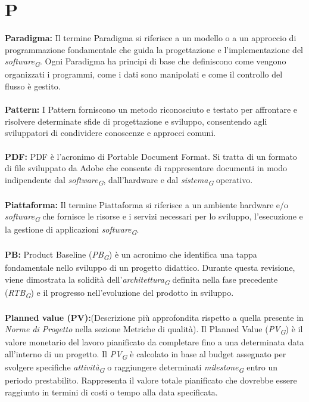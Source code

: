 \documentclass{article}
\begin{document}
\section*{P}
{}
\textbf{Paradigma:} Il termine Paradigma si riferisce a un modello o a un approccio di programmazione fondamentale che guida la progettazione e l'implementazione del \textit{software}\textsubscript{\textit{G}}. Ogni Paradigma ha principi di base che definiscono come vengono organizzati i programmi, come i dati sono manipolati e come il controllo del flusso è gestito.
\\
\\
\textbf{Pattern:} I Pattern forniscono un metodo riconosciuto e testato per affrontare e risolvere determinate sfide di progettazione e sviluppo, consentendo agli sviluppatori di condividere conoscenze e approcci comuni.
\\
\\
\textbf{PDF:} PDF è l'acronimo di Portable Document Format. Si tratta di un formato di file sviluppato da Adobe che consente di rappresentare documenti in modo indipendente dal \textit{software}\textsubscript{\textit{G}}, dall'hardware e dal \textit{sistema}\textsubscript{\textit{G}} operativo.
\\
\\
\textbf{Piattaforma:} Il termine Piattaforma si riferisce a un ambiente hardware e/o \textit{software}\textsubscript{\textit{G}} che fornisce le risorse e i servizi necessari per lo sviluppo, l'esecuzione e la gestione di applicazioni \textit{software}\textsubscript{\textit{G}}.
\\
\\
\textbf{PB:} Product Baseline (\textit{PB}\textsubscript{\textit{G}}) è un acronimo che identifica una tappa fondamentale nello sviluppo di un progetto didattico. Durante questa revisione, viene dimostrata la solidità dell'\textit{architettura}\textsubscript{\textit{G}} definita nella fase precedente (\textit{RTB}\textsubscript{\textit{G}}) e il progresso nell'evoluzione del prodotto in sviluppo.
\\
\\
\textbf{Planned value (PV):}(Descrizione più approfondita rispetto a quella presente in \textit{Norme di Progetto} nella sezione Metriche di qualità). 
Il Planned Value (\textit{PV}\textsubscript{\textit{G}}) è il valore monetario del lavoro pianificato da completare fino a una determinata data all'interno di un progetto. Il \textit{PV}\textsubscript{\textit{G}} è calcolato in base al budget assegnato per svolgere specifiche \textit{attività}\textsubscript{\textit{G}} o raggiungere determinati \textit{milestone}\textsubscript{\textit{G}} entro un periodo prestabilito. Rappresenta il valore totale pianificato che dovrebbe essere raggiunto in termini di costi o tempo alla data specificata.
\end{document}

